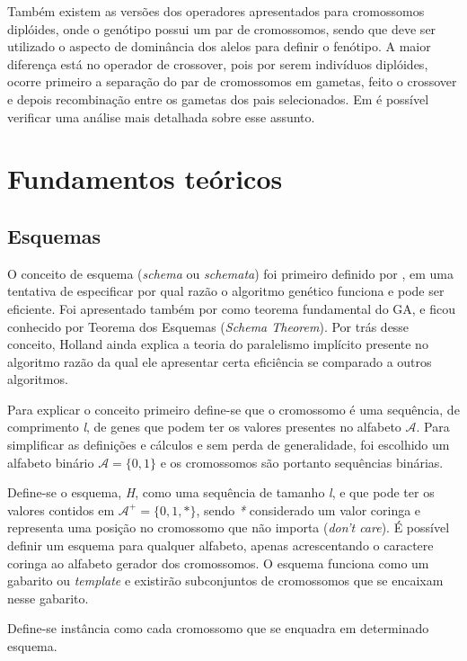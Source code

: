Também existem as versões dos operadores apresentados para cromossomos diplóides, onde o genótipo possui um par de cromossomos, sendo que deve ser utilizado o aspecto de dominância dos alelos para definir o fenótipo. A maior diferença está no operador de crossover, pois por serem indivíduos diplóides, ocorre primeiro a separação do par de cromossomos em gametas, feito o crossover e depois recombinação entre os gametas dos pais selecionados. Em  é possível verificar uma análise mais detalhada sobre esse assunto.

\section{Fundamentos teóricos}
\subsection{Esquemas}
\label{sec:esquemas}
O conceito de esquema (\textit{schema} ou \textit{schemata}) foi primeiro definido por \citeauthor{Holland1992}, em uma tentativa de especificar por qual razão o algoritmo genético funciona e pode ser eficiente. Foi apresentado também por \citeauthor{Goldberg1989} como teorema fundamental do GA, e ficou conhecido por Teorema dos Esquemas (\textit{Schema Theorem}). Por trás desse conceito, Holland ainda explica a teoria do paralelismo implícito presente no algoritmo razão da qual ele apresentar certa eficiência se comparado a outros algoritmos.

Para explicar o conceito primeiro define-se que o cromossomo é uma sequência, de comprimento \textit{l}, de genes que podem ter os valores presentes no alfabeto \(\mathcal{A}\). Para simplificar as definições e cálculos e sem perda de generalidade, foi escolhido um alfabeto binário \(\mathcal{A} = \{0, 1\}\) e os cromossomos são portanto sequências binárias. 

Define-se o esquema, \textit{H}, como uma sequência de tamanho \textit{l}, e que pode ter os valores contidos em \(\mathcal{A}^+ = \{0, 1 , *\}\), sendo \textit{*} considerado um valor coringa e representa uma posição no cromossomo que não importa (\textit{don't care}). É possível definir um esquema para qualquer alfabeto, apenas acrescentando o caractere coringa ao alfabeto gerador dos cromossomos. O esquema funciona como um gabarito ou \textit{template} e existirão subconjuntos de cromossomos que se encaixam nesse gabarito. 

Define-se instância como cada cromossomo que se enquadra em determinado esquema.

